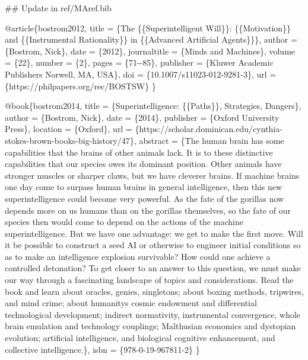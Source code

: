 \documentclass[
  11pt,
  letterpaper,
]{book}
\newenvironment{Shaded}{\begin{snugshade}}{\end{snugshade}}
\newcommand{\FunctionTok}[1]{\textcolor[rgb]{0.28,0.35,0.67}{#1}}
\newcommand{\NormalTok}[1]{\textcolor[rgb]{0.00,0.23,0.31}{#1}}
\begin{document}
\begin{Shaded}
\begin{Highlighting}[]

\FunctionTok{\#\# Update in ref/MAref.bib}

\NormalTok{@article\{bostrom2012,}
\NormalTok{  title = \{The \{\{Superintelligent Will\}\}: \{\{Motivation\}\} and \{\{Instrumental Rationality\}\} in \{\{Advanced Artificial Agents\}\}\},}
\NormalTok{  author = \{Bostrom, Nick\},}
\NormalTok{  date = \{2012\},}
\NormalTok{  journaltitle = \{Minds and Machines\},}
\NormalTok{  volume = \{22\},}
\NormalTok{  number = \{2\},}
\NormalTok{  pages = \{71{-}{-}85\},}
\NormalTok{  publisher = \{Kluwer Academic Publishers Norwell, MA, USA\},}
\NormalTok{  doi = \{10.1007/s11023{-}012{-}9281{-}3\},}
\NormalTok{  url = \{https://philpapers.org/rec/BOSTSW\}}
\NormalTok{\}}

\NormalTok{@book\{bostrom2014,}
\NormalTok{  title = \{Superintelligence: \{\{Paths\}\}, Strategies, Dangers\},}
\NormalTok{  author = \{Bostrom, Nick\},}
\NormalTok{  date = \{2014\},}
\NormalTok{  publisher = \{Oxford University Press\},}
\NormalTok{  location = \{Oxford\},}
\NormalTok{  url = \{https://scholar.dominican.edu/cynthia{-}stokes{-}brown{-}books{-}big{-}history/47\},}
\NormalTok{  abstract = \{The human brain has some capabilities that the brains of other animals lack. It is to these distinctive capabilities that our species owes its dominant position. Other animals have stronger muscles or sharper claws, but we have cleverer brains. If machine brains one day come to surpass human brains in general intelligence, then this new superintelligence could become very powerful. As the fate of the gorillas now depends more on us humans than on the gorillas themselves, so the fate of our species then would come to depend on the actions of the machine superintelligence. But we have one advantage: we get to make the first move. Will it be possible to construct a seed AI or otherwise to engineer initial conditions so as to make an intelligence explosion survivable? How could one achieve a controlled detonation? To get closer to an answer to this question, we must make our way through a fascinating landscape of topics and considerations. Read the book and learn about oracles, genies, singletons; about boxing methods, tripwires, and mind crime; about humanity\textquotesingle{}s cosmic endowment and differential technological development; indirect normativity, instrumental convergence, whole brain emulation and technology couplings; Malthusian economics and dystopian evolution; artificial intelligence, and biological cognitive enhancement, and collective intelligence.\},}
\NormalTok{  isbn = \{978{-}0{-}19{-}967811{-}2\}}
\NormalTok{\}}


\end{Highlighting}
\end{Shaded}
\end{document}
